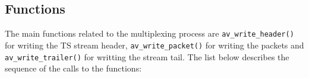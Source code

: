 \documentclass[
	12pt,				%
	openright,			%
	twoside,			%
	a4paper,			%
	brazil,
	french,				%
	english
	]{abntex2}
\begin{document}

\subsection{Functions}

The main functions related to the multiplexing process are \texttt{av\hspace{0.1mm}\hspace{0.1mm}\_\hspace{0.1mm}\hspace{0.1mm}write\hspace{0.1mm}\hspace{0.1mm}\_\hspace{0.1mm}\hspace{0.1mm}header()} for writing the TS stream header, \texttt{av\hspace{0.1mm}\hspace{0.1mm}\_\hspace{0.1mm}\hspace{0.1mm}write\hspace{0.1mm}\hspace{0.1mm}\_\hspace{0.1mm}\hspace{0.1mm}packet()} for writing the packets and \texttt{av\hspace{0.1mm}\hspace{0.1mm}\_\hspace{0.1mm}\hspace{0.1mm}write\hspace{0.1mm}\hspace{0.1mm}\_\hspace{0.1mm}\hspace{0.1mm}trailer()} for writting the stream tail. The list below describes the sequence of the calls to the functions:
\end{document}
